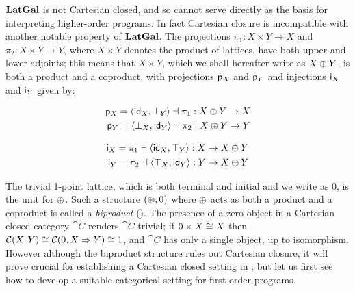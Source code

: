 $\mathbf{LatGal}$ is not Cartesian closed, and so cannot serve directly as the basis for interpreting higher-order
programs. In fact Cartesian closure is incompatible with another notable property of $\mathbf{LatGal}$. The
projections $\pi_1: X \times Y \to X$ and $\pi_2: X \times Y \to Y$, where $X \times Y$ denotes the product of
lattices, have both upper and lower adjoints; this means that $X \times Y$, which we shall hereafter write as
$X \oplus Y$, is both a product and a coproduct, with projections $\mathsf{p}_X$ and $\mathsf{p}_Y$ and
injections $\mathsf{i}_X$ and $\mathsf{i}_Y$ given by:

\vspace{-4mm}
\begin{minipage}[t]{0.45\textwidth}
\begin{center}
\begin{align*}
   \mathsf{p}_X = \langle \mathsf{id}_X, \bot_Y\rangle \dashv \pi_1: X \oplus Y \to X \\
   \mathsf{p}_Y = \langle \bot_X, \mathsf{id}_Y\rangle \dashv \pi_2: X \oplus Y \to Y
\end{align*}
\end{center}
\end{minipage}%
\begin{minipage}[t]{0.45\textwidth}
\begin{center}
\begin{align*}
   \mathsf{i}_X = \pi_1 \dashv \langle \mathsf{id}_X, \top_Y\rangle : X \to X \oplus Y \\
   \mathsf{i}_Y = \pi_2 \dashv \langle \top_X, \mathsf{id}_Y\rangle: Y \to X \oplus Y
\end{align*}
\end{center}
\end{minipage}
\vspace{2mm}

\noindent The trivial 1-point lattice, which is both terminal and initial and we write as $0$, is the unit for
$\oplus$. Such a structure $(\oplus, 0)$ where $\oplus$ acts as both a product and a coproduct is called a
\emph{biproduct} (). The presence of a zero object in a Cartesian closed category $\cat{C}$
renders $\cat{C}$ trivial; if $0 \times X \cong X$ then ${\mathcal{C}}(X,Y) \cong {\mathcal{C}}(0,X
\Rightarrow Y) \cong 1$, and $\cat{C}$ has only a single object, up to isomorphism. However although the
biproduct structure rules out Cartesian closure, it will prove crucial for establishing a Cartesian closed
setting in ; but let us first see how to develop a suitable categorical setting for
first-order programs.
